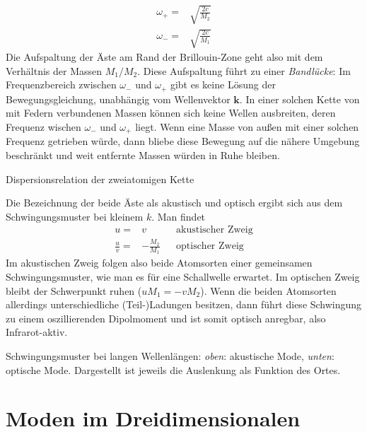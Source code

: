 \begin{align}
\omega_+ = & \sqrt{\frac{2 c}{M_2}} \\
\omega_- = & \sqrt{\frac{2 c}{M_1} }
\end{align}
Die Aufspaltung der Äste am Rand der Brillouin-Zone geht also mit dem Verhältnis der Massen $M_1 / M_2$. Diese Aufspaltung führt zu einer \emph{Bandlücke}: Im Frequenzbereich zwischen $\omega_- $ und $\omega_+$ gibt es keine Lösung der Bewegungsgleichung, unabhängig vom Wellenvektor $\mathbf{k}$. In einer solchen Kette von mit Federn verbundenen Massen können sich keine Wellen ausbreiten, deren Frequenz wischen $\omega_- $ und $\omega_+$ liegt. Wenn eine Masse von außen mit einer solchen Frequenz getrieben würde, dann bliebe diese Bewegung auf die nähere Umgebung beschränkt und weit entfernte Massen würden in Ruhe bleiben.




\begin{marginfigure}

\caption{Dispersionsrelation der zweiatomigen Kette}
\end{marginfigure}

Die Bezeichnung der beide Äste als akustisch und optisch ergibt sich aus dem Schwingungsmuster bei kleinem $k$. Man findet
\begin{align}
 u = &v &&  \text{akustischer Zweig} \\
  \frac{u}{v} = &- \frac{M_2}{M_1} &&  \text{optischer Zweig} 
\end{align}
Im akustischen Zweig folgen also beide Atomsorten einer gemeinsamen Schwingungsmuster, wie man es für eine Schallwelle erwartet. Im optischen Zweig bleibt der Schwerpunkt ruhen ($u M_1 = - v M_2$). Wenn die beiden Atomsorten allerdings unterschiedliche (Teil-)Ladungen besitzen, dann führt diese Schwingung zu einem oszillierenden Dipolmoment und ist somit optisch anregbar, also Infrarot-aktiv.


\begin{marginfigure}
\caption{Schwingungsmuster bei langen Wellenlängen: \textit{oben}: akustische Mode, \textit{unten}: optische Mode. Dargestellt ist jeweils die Auslenkung als Funktion des Ortes.}
\end{marginfigure}





\section{Moden im Dreidimensionalen}

